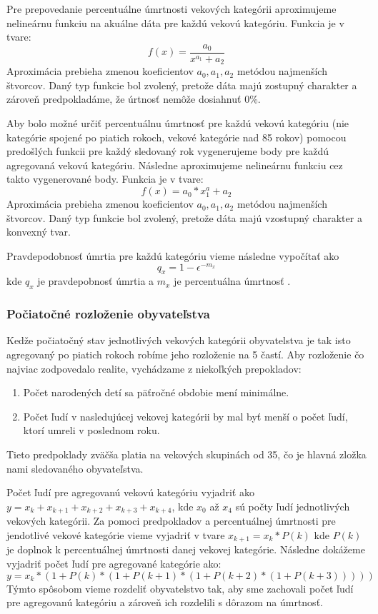 \documentclass[a4paper, 11pt]{article}
\begin{document}
Pre prepovedanie percentuálne úmrtnosti vekových kategórii aproximujeme nelineárnu funkciu na akuálne dáta pre každú vekovú kategóriu. Funkcia je v tvare:
$$f(x)=\frac{a_0}{x^{a_1} + a_2}$$
Aproximácia prebieha zmenou koeficientov $a_0, a_1, a_2$ metódou najmenších štvorcov\cite{spline}. Daný typ funkcie bol zvolený, pretože dáta majú zostupný charakter a zároveň predpokladáme, že úrtnosť nemôže dosiahnuť 0\%.

Aby bolo možné určiť percentuálnu úmrtnosť pre každú vekovú kategóriu (nie kategórie spojené po piatich rokoch, vekové kategórie nad 85 rokov) pomocou predošlých funkcii pre každý sledovaný rok vygenerujeme body pre každú agregovaná vekovú kategóriu. Následne aproximujeme nelineárnu funkciu cez takto vygenerované body. Funkcia je v tvare:
$$f(x) = a_0 * x^a_1 + a_2$$
Aproximácia prebieha zmenou koeficientov $a_0, a_1, a_2$ metódou najmenších štvorcov. Daný typ funkcie bol zvolený, pretože dáta majú vzostupný charakter a konvexný tvar.

Pravdepodobnosť úmrtia pre každú kategóriu vieme následne vypočítať ako 
$$q_x = 1 - \epsilon^{-m_x} $$
kde $q_x$ je pravdepobnosť úmrtia a $m_x$ je percentuálna úmrtnosť \cite{prob}.

\subsubsection*{Počiatočné rozloženie obyvateľstva}
Kedže počiatočný stav jednotlivých vekových kategórii obyvatelstva je tak isto agregovaný po piatich rokoch robíme jeho rozloženie na 5 častí. Aby rozloženie čo najviac zodpovedalo realite, vychádzame z niekoľkých prepokladov:
\begin{enumerate}
\item Počet narodených detí sa päťročné obdobie mení minimálne.
\item Počet ľudí v nasledujúcej vekovej kategórii by mal byť menší o počet ľudí, ktorí umreli v poslednom roku.
\end{enumerate}
Tieto predpoklady zväčša platia na vekových skupinách od 35, čo je hlavná zložka nami sledovaného obyvateľstva.

Počet ľudí pre agregovanú vekovú kategóriu vyjadriť ako $y = x_{k} + x_{k+1} + x_{k+2} + x_{k+3} + x_{k+4}$, kde $x_0$ až $x_4$ sú počty ľudí jednotlivých vekových kategórii. Za pomoci predpokladov a percentuálnej úmrtnosti pre jendotlivé vekové kategórie vieme vyjadriť v tvare $x_{k+1}=x_{k}*P(k)$ kde $P(k)$ je doplnok k percentuálnej úmrtnosti danej vekovej kategórie. Následne dokážeme vyjadriť počet ľudí pre agregované kategórie ako:
$$y = x_k*(1 + P(k)*(1 + P(k+1)*(1 + P(k+2) * (1 + P(k+3)))))$$
Týmto spôsobom vieme rozdeliť obyvatelstvo tak, aby sme zachovali počet ľudí pre agregovanú kategóriu a zároveň ich rozdelili s dôrazom na úmrtnosť.
\end{document}
